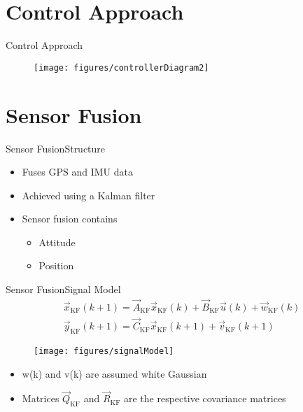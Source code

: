 \section{Control Approach}

\begin{frame}{Control Approach}{}
    \begin{figure}[H]
        \centering
        \texttt{[image: figures/controllerDiagram2]}
    \end{figure}
\end{frame}

\section{Sensor Fusion}

\begin{frame}{Sensor Fusion}{Structure}
	\begin{itemize}

		\item Fuses GPS and IMU data
		\item Achieved using a Kalman filter
		\item Sensor fusion contains
			\begin{itemize}
		\item Attitude
		\item Position
			\end{itemize}
	\end{itemize}

\end{frame}
\begin{frame}{Sensor Fusion}{Signal Model}
	\begin{gather*}
    \vec{x}_\mathrm{KF}(k+1) = \vec{A}_\mathrm{KF}\vec{x}_\mathrm{KF}(k) + \vec{B}_\mathrm{KF} \vec{u}(k) + \vec{w}_\mathrm{KF}(k)  \nonumber \\
    \vec{y}_\mathrm{KF}(k+1) = \vec{C}_\mathrm{KF} \vec{x}_\mathrm{KF}(k+1) + \vec{v}_\mathrm{KF}(k+1)  \nonumber
    \end{gather*}
    \begin{figure}[H]
        \centering
        \texttt{[image: figures/signalModel]}
    \end{figure}
	\begin{itemize}
		\item w(k) and v(k) are assumed white Gaussian
		\item Matrices $\vec{Q}_\mathrm{KF}$ and $\vec{R}_\mathrm{KF}$ are the respective covariance matrices
	\end{itemize}

\end{frame}

